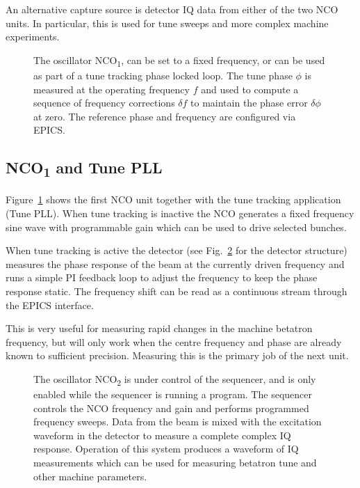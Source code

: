 \documentclass{jacow}
\begin{document}
An alternative capture source is detector IQ data from either of the two NCO
units.  In particular, this is used for tune sweeps and more complex machine
experiments.


\begin{figure}[hbt]
\begin{centering}

\end{centering}
\caption{
The oscillator NCO\textsubscript1, can be set to a fixed frequency, or
can be used as part of a tune tracking phase locked loop.  The tune phase $\phi$
is measured at the operating frequency $f$ and used to compute a sequence of
frequency corrections $\delta\!f$ to maintain the phase error $\delta\phi$ at
zero.  The reference phase and frequency are configured via EPICS.
}
\label{nco1}
\end{figure}


\subsection{NCO\textsubscript1 and Tune PLL}

Figure~\ref{nco1} shows the first NCO unit together with the tune tracking
application (Tune PLL).  When tune tracking is inactive the NCO generates a
fixed frequency sine wave with programmable gain which can be used to drive
selected bunches.

When tune tracking is active the detector (see Fig.~\ref{nco2} for the detector
structure) measures the phase response of the beam at the currently driven
frequency and runs a simple PI feedback loop to adjust the frequency to keep the
phase response static.  The frequency shift can be read as a continuous stream
through the EPICS interface.

This is very useful for measuring rapid changes in the machine betatron
frequency, but will only work when the centre frequency and phase are already
known to sufficient precision.  Measuring this is the primary job of the next
unit.



\begin{figure}[hbt]
\begin{centering}

\end{centering}
\caption{
The oscillator NCO\textsubscript2 is under control of the sequencer, and is only
enabled while the sequencer is running a program.  The sequencer controls the
NCO frequency and gain and performs programmed frequency sweeps.  Data from the
beam is mixed with the excitation waveform  in the detector to measure a
complete complex IQ response.  Operation of this system produces a waveform of
IQ measurements which can be used for measuring betatron tune and other machine
parameters.
}
\label{nco2}
\end{figure}
\end{document}
